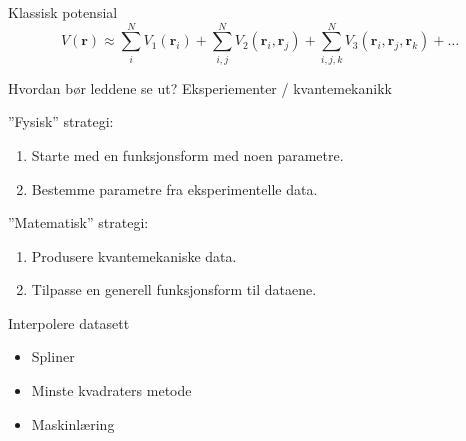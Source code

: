\documentclass{beamer}
\begin{document}
\begin{frame}

\begin{block}{Klassisk potensial}
  \begin{equation*}
  V(\mathbf{r}) \approx \sum_i^N V_1(\mathbf{r}_i) + \sum_{i,j}^N V_2(\mathbf{r}_i, \mathbf{r}_j) + 
  \sum_{i,j,k}^N V_3(\mathbf{r}_i, \mathbf{r}_j, \mathbf{r}_k) + \dots
  \end{equation*}
\end{block}

\begin{block}{Hvordan bør leddene se ut?}
Eksperiementer / kvantemekanikk
\end{block}

\end{frame}


\begin{frame}

\begin{block}{''Fysisk'' strategi:}
 \begin{enumerate}
  \item Starte med en funksjonsform med noen parametre.
  \item Bestemme parametre fra eksperimentelle data.
 \end{enumerate}
\end{block}

\begin{block}{''Matematisk'' strategi:}
 \begin{enumerate}
  \item Produsere kvantemekaniske data. 
  \item Tilpasse en generell funksjonsform til dataene.
 \end{enumerate}
\end{block}

\end{frame}


\begin{frame}
 
\begin{block}{Interpolere datasett}
 \begin{itemize}
  \item Spliner
  \item Minste kvadraters metode
  \item Maskinlæring
 \end{itemize}
\end{block}
 
\end{frame}
\end{document}
